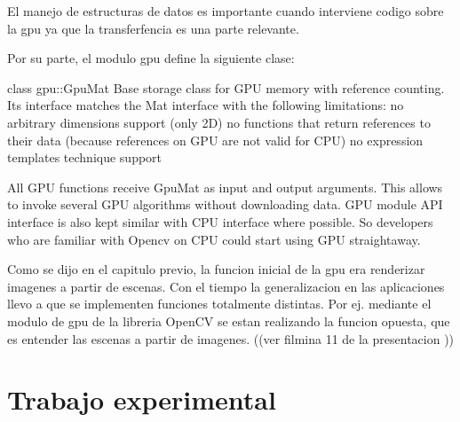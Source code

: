 \documentclass[a4paper,10pt]{report}
\begin{document}
El manejo de estructuras de datos es importante cuando interviene codigo sobre la gpu ya que la transferfencia es una parte relevante. 

Por su parte, el modulo gpu define la siguiente clase:

class gpu::GpuMat
Base storage class for GPU memory with reference counting. Its interface matches the Mat interface with the following limitations:
no arbitrary dimensions support (only 2D)
no functions that return references to their data (because references on GPU are not valid for CPU)
no expression templates technique support

All GPU functions receive GpuMat as input and output arguments. This allows to invoke several GPU algorithms without downloading data. GPU module API interface is also kept similar with CPU interface where possible. So developers who are familiar with Opencv on CPU could start using GPU straightaway.






Como se dijo en el capitulo previo, la funcion inicial de la gpu era renderizar imagenes a partir de escenas. 
Con el tiempo la generalizacion en las aplicaciones llevo a que se implementen funciones totalmente distintas. 
Por ej. mediante el modulo de gpu de la libreria OpenCV se estan realizando la funcion opuesta, que es entender las escenas a partir de imagenes. ((ver filmina 11 de la presentacion ))




\chapter{Trabajo experimental}
\end{document}
